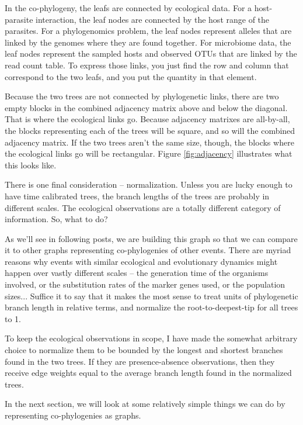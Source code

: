 \documentclass[
10pt, %
a4paper, %
oneside, %
headinclude,footinclude, %
BCOR5mm, %
]{scrartcl}
\begin{document}


In the co-phylogeny, the leafs are connected by ecological data. For a host-parasite interaction, the leaf nodes are connected by the host range of the parasites. For a phylogenomics problem, the leaf nodes represent alleles that are linked by the genomes where they are found together. For microbiome data, the leaf nodes represent the sampled hosts and observed OTUs that are linked by the read count table. To express those links, you just find the row and column that correspond to the two leafs, and you put the quantity in that element.

Because the two trees are not connected by phylogenetic links, there are two empty blocks in the combined adjacency matrix above and below the diagonal. That is where the ecological links go. Because adjacency matrixes are all-by-all, the blocks representing each of the trees will be square, and so will the combined adjacency matrix. If the two trees aren't the same size, though, the blocks where the ecological links go will be rectangular. Figure \ref{fig:adjacency} illustrates what this looks like.

There is one final consideration -- normalization. Unless you are lucky enough to have time calibrated trees, the branch lengths of the trees are probably in different scales. The ecological observations are a totally different category of information. So, what to do?

As we'll see in following posts, we are building this graph so that we can compare it to other graphs representing co-phylogenies of other events. There are myriad reasons why events with similar ecological and evolutionary dynamics might happen over vastly different scales -- the generation time of the organisms involved, or the substitution rates of the marker genes used, or the population sizes... Suffice it to say that it makes the most sense to treat units of phylogenetic branch length in relative terms, and normalize the root-to-deepest-tip for all trees to 1.

To keep the ecological observations in scope, I have made the somewhat arbitrary choice to normalize them to be bounded by the longest and shortest branches found in the two trees. If they are presence-absence observations, then they receive edge weights equal to the average branch length found in the normalized trees. 

In the next section, we will look at some relatively simple things we can do by representing co-phylogenies as graphs.
\end{document}
